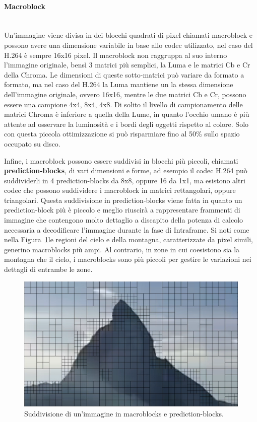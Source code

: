 \documentclass[a4paper,12pt, oneside]{article}
\begin{document}
\paragraph{Macroblock}\hphantom{A}\\
Un'immagine viene divisa in dei blocchi quadrati di pixel chiamati macroblock e possono avere una
dimensione variabile in base allo codec utilizzato, nel caso del H.264 è sempre 16x16 pixel. Il
macroblock non raggruppa al suo interno l'immagine originale, bensì 3 matrici più semplici, la
Luma e le matrici Cb e Cr della Chroma. Le dimensioni di queste sotto-matrici può variare da
formato a formato, ma nel caso del H.264 la Luma mantiene un la stessa dimensione dell'immagine
originale, ovvero 16x16, mentre le due matrici Cb e Cr, possono essere una campione 4x4, 8x4, 4x8.
Di solito il livello di campionamento delle matrici Chroma è inferiore a quella della Lume, in quanto
l'occhio umano è più attente ad osservare la luminosità e i bordi degli oggetti rispetto al colore.
Solo con questa piccola ottimizzazione si può risparmiare fino al 50\% sullo spazio occupato su disco.

Infine, i macroblock possono essere suddivisi in blocchi più piccoli, chiamati
\textbf{prediction-blocks}, di vari dimensioni e forme, ad esempio il codec H.264 può suddividerli in
4 prediction-blocks da 8x8, oppure 16 da 1x1, ma esistono altri codec che possono suddividere i
macroblock in matrici rettangolari, oppure triangolari. Questa suddivisione in prediction-blocks
viene fatta in quanto un prediction-block più è piccolo e meglio riuscirà a rappresentare frammenti
di immagine che contengono molto dettaglio a discapito della potenza di calcolo necessaria a
decodificare l'immagine durante la fase di Intraframe. Si noti come nella
Figura~\ref{fig:macroblocks_sub_division}le regioni del cielo e della montagna, caratterizzate da
pixel simili, generino macroblocks più ampi. Al contrario, in zone in cui coesistono sia la montagna
che il cielo, i macroblocks sono più piccoli per gestire le variazioni nei dettagli di entrambe le
zone.

\begin{figure}[h]
    \centering
    \includegraphics[width=1\textwidth]{images/macroblocks_sub-division.png}
    \caption{Suddivisione di un'immagine in macroblocks e prediction-blocks.}
    \label{fig:macroblocks_sub_division}
\end{figure}
\end{document}
